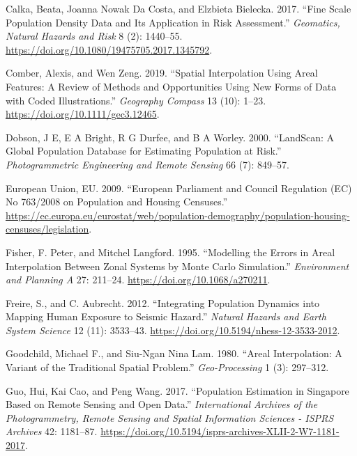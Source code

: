 \begin{CSLReferences}{1}{0}
\leavevmode{}%
Calka, Beata, Joanna Nowak Da Costa, and Elzbieta Bielecka. 2017. {``Fine Scale Population Density Data and Its Application in Risk Assessment.''} \emph{Geomatics, Natural Hazards and Risk} 8 (2): 1440--55. \url{https://doi.org/10.1080/19475705.2017.1345792}.

\leavevmode{}%
Comber, Alexis, and Wen Zeng. 2019. {``Spatial Interpolation Using Areal Features: A Review of Methods and Opportunities Using New Forms of Data with Coded Illustrations.''} \emph{Geography Compass} 13 (10): 1--23. \url{https://doi.org/10.1111/gec3.12465}.

\leavevmode{}%
Dobson, J E, E A Bright, R G Durfee, and B A Worley. 2000. {``LandScan: A Global Population Database for Estimating Population at Risk.''} \emph{Photogrammetric Engineering and Remote Sensing} 66 (7): 849--57.

\leavevmode{}%
European Union, EU. 2009. {``European Parliament and Council Regulation (EC) No 763/2008 on Population and Housing Censuses.''} \url{https://ec.europa.eu/eurostat/web/population-demography/population-housing-censuses/legislation}.

\leavevmode{}%
Fisher, F. Peter, and Mitchel Langford. 1995. {``Modelling the Errors in Areal Interpolation Between Zonal Systems by Monte Carlo Simulation.''} \emph{Environment and Planning A} 27: 211--24. \url{https://doi.org/10.1068/a270211}.

\leavevmode{}%
Freire, S., and C. Aubrecht. 2012. {``Integrating Population Dynamics into Mapping Human Exposure to Seismic Hazard.''} \emph{Natural Hazards and Earth System Science} 12 (11): 3533--43. \url{https://doi.org/10.5194/nhess-12-3533-2012}.

\leavevmode{}%
Goodchild, Michael F., and Siu-Ngan Nina Lam. 1980. {``Areal Interpolation: A Variant of the Traditional Spatial Problem.''} \emph{Geo-Processing} 1 (3): 297--312.

\leavevmode{}%
Guo, Hui, Kai Cao, and Peng Wang. 2017. {``Population Estimation in Singapore Based on Remote Sensing and Open Data.''} \emph{International Archives of the Photogrammetry, Remote Sensing and Spatial Information Sciences - ISPRS Archives} 42: 1181--87. \url{https://doi.org/10.5194/isprs-archives-XLII-2-W7-1181-2017}.


\end{CSLReferences}
